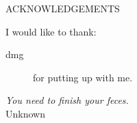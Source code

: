 \newpage
{}

\begin{center}
ACKNOWLEDGEMENTS
\end{center}

\noindent I would like to thank:
\begin{description}
\item[dmg]
	for putting up with me.
\end{description}

\begin{flushright}
\textit{You need to finish your feces.}
\\
Unknown \\
\end{flushright}
